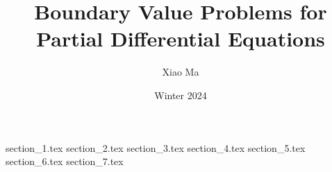 \documentclass{article}
\title{Boundary Value Problems for Partial Differential Equations}
\author{Xiao Ma}
\date{Winter 2024}
\theoremstyle{remark}
\numberwithin{equation}{section}
\begin{document}
\maketitle

{section_1.tex}
{section_2.tex}
{section_3.tex}
{section_4.tex}
{section_5.tex}
{section_6.tex}
{section_7.tex}
\end{document}
